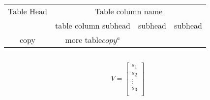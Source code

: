 \documentclass[a4paper,20pt]{book}
\begin{document}
\begin{tabular}{|c|c |c |c| }

\hline
Table Head& \multicolumn{3}{|c|}{Table column name}\\ 
\cline{2-4}
& table column subhead&subhead&subhead\\
\hline
copy&more table$ copy^a$ & &\\
\hline

\end{tabular}
$$ $$

\[V=\begin{bmatrix}

s_1\\
s_2\\
\vdots\\
s_3\\
\end{bmatrix}
\]

	
\end{document}
